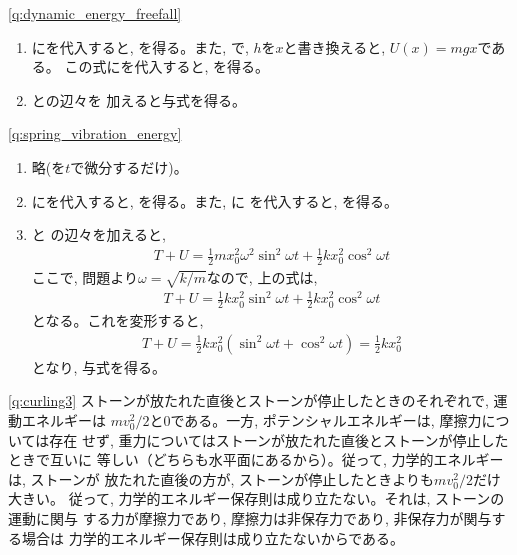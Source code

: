 \ref{q:dynamic_energy_freefall}
\begin{enumerate}
\item {}にを代入すると, 
を得る。また, で, $h$を$x$と書き換えると, $U(x)=mgx$である。
この式にを代入すると, 
を得る。
\item {}との辺々を
加えると与式を得る。
\end{enumerate}

\ref{q:spring_vibration_energy}
\begin{enumerate}
\item 略(を$t$で微分するだけ)。
\item {}にを代入すると, 
を得る。また, に
を代入すると, 
を得る。
\item 
{}と
の辺々を加えると,
\begin{eqnarray*}
T+U=\frac{1}{2}mx_0^2\omega^2\sin^2\omega t+\frac{1}{2}kx_0^2\cos^2\omega t
\end{eqnarray*}
ここで, 問題より$\omega=\sqrt{k/m}$なので, 上の式は, 
\begin{eqnarray*}
T+U=\frac{1}{2}kx_0^2\sin^2\omega t+\frac{1}{2}kx_0^2\cos^2\omega t
\end{eqnarray*}
となる。これを変形すると, 
\begin{eqnarray*}
T+U=\frac{1}{2}kx_0^2(\sin^2\omega t+\cos^2\omega t)=\frac{1}{2}kx_0^2
\end{eqnarray*}
となり, 与式を得る。
\end{enumerate}

\ref{q:curling3} 
ストーンが放たれた直後とストーンが停止したときのそれぞれで, 運動エネルギーは
$mv_0^2/2$と$0$である。一方, ポテンシャルエネルギーは, 摩擦力については存在
せず, 重力についてはストーンが放たれた直後とストーンが停止したときで互いに
等しい（どちらも水平面にあるから）。従って, 力学的エネルギーは, ストーンが
放たれた直後の方が, ストーンが停止したときよりも$mv_0^2/2$だけ大きい。
従って, 力学的エネルギー保存則は成り立たない。それは, ストーンの運動に関与
する力が摩擦力であり, 摩擦力は非保存力であり, 非保存力が関与する場合は
力学的エネルギー保存則は成り立たないからである。
\vspace{0.2cm}


